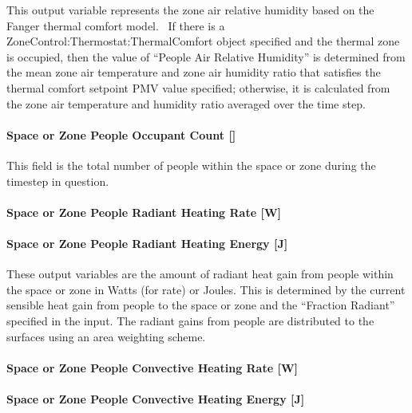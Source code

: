 This output variable represents the zone air relative humidity based on the Fanger thermal comfort model.~ If there is a ZoneControl:Thermostat:ThermalComfort object specified and the thermal zone is occupied, then the value of ``People Air Relative Humidity'' is determined from the mean zone air temperature and zone air humidity ratio that satisfies the thermal comfort setpoint PMV value specified; otherwise, it is calculated from the zone air temperature and humidity ratio averaged over the time step.

\paragraph{Space or Zone People Occupant Count {[]}}\label{zone-people-occupant-count}

This field is the total number of people within the space or zone during the timestep in question.

\paragraph{Space or Zone People Radiant Heating Rate {[}W{]}}\label{zone-people-radiant-heating-rate-w}

\paragraph{Space or Zone People Radiant Heating Energy {[}J{]}}\label{zone-people-radiant-heating-energy-j}

These output variables are the amount of radiant heat gain from people within the space or zone in Watts (for rate) or Joules. This is determined by the current sensible heat gain from people to the space or zone and the ``Fraction Radiant'' specified in the input. The radiant gains from people are distributed to the surfaces using an area weighting scheme.

\paragraph{Space or Zone People Convective Heating Rate {[}W{]}}\label{zone-people-convective-heating-rate-w}

\paragraph{Space or Zone People Convective Heating Energy {[}J{]}}\label{zone-people-convective-heating-energy-j}

